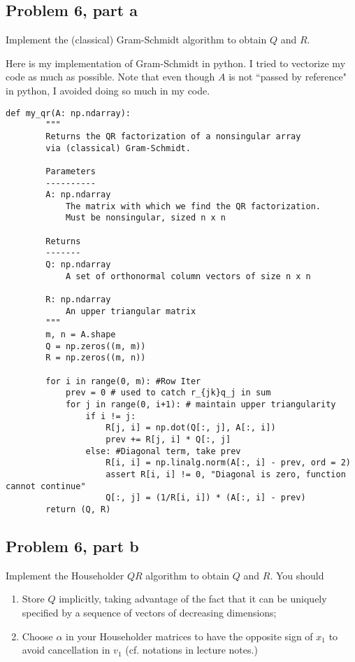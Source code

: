 \newpage
\subsection{Problem 6, part a}
Implement the (classical) Gram-Schmidt algorithm to obtain $Q$ and $R$.
\partbreak
\begin{solution}

    Here is my implementation of Gram-Schmidt in python. I tried to vectorize my code as much as possible. Note that even though $A$ is not ``passed by reference" in python, I avoided doing so much in my code.  

\begin{lstlisting}
def my_qr(A: np.ndarray):
        """
        Returns the QR factorization of a nonsingular array
        via (classical) Gram-Schmidt.

        Parameters
        ----------
        A: np.ndarray
            The matrix with which we find the QR factorization.
            Must be nonsingular, sized n x n

        Returns
        -------
        Q: np.ndarray
            A set of orthonormal column vectors of size n x n

        R: np.ndarray
            An upper triangular matrix
        """
        m, n = A.shape
        Q = np.zeros((m, m))
        R = np.zeros((m, n))

        for i in range(0, m): #Row Iter
            prev = 0 # used to catch r_{jk}q_j in sum
            for j in range(0, i+1): # maintain upper triangularity
                if i != j:
                    R[j, i] = np.dot(Q[:, j], A[:, i])
                    prev += R[j, i] * Q[:, j]
                else: #Diagonal term, take prev
                    R[i, i] = np.linalg.norm(A[:, i] - prev, ord = 2)
                    assert R[i, i] != 0, "Diagonal is zero, function cannot continue"
                    Q[:, j] = (1/R[i, i]) * (A[:, i] - prev)
        return (Q, R)
\end{lstlisting}
\end{solution}

\newpage
\subsection{Problem 6, part b}
Implement the Householder $QR$ algorithm to obtain $Q$ and $R$. You should 
\begin{enumerate}
    \item Store $Q$ implicitly, taking advantage of the fact that it can be uniquely specified by a sequence of vectors of decreasing dimensions;
    \item Choose $\alpha$ in your Householder matrices to have the opposite sign of $x_1$ to avoid cancellation in $v_1$ (cf. notations in lecture notes.)
\end{enumerate}
\partbreak

